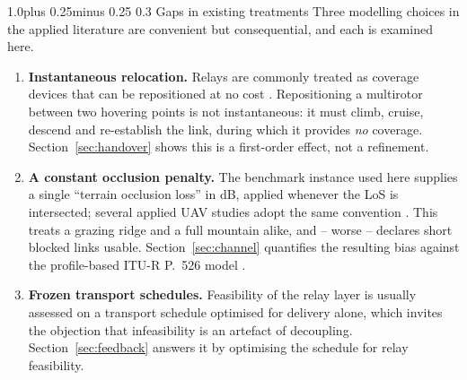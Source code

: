 \documentclass[11pt]{article}
\makeatletter
\def\subsection{\@startsection{subsection}{2}{\z@}%
    {1.0\baselineskip plus 0.25\baselineskip minus 0.25\baselineskip}%
    {0.3\baselineskip}%
    {\normalfont\normalsize\itshape}}%
\theoremstyle{dshplain}
\theoremstyle{dshdefn}
\makeatother
\begin{document}
\subsection{Gaps in existing treatments}
Three modelling choices in the applied literature are convenient but
consequential, and each is examined here.
\begin{enumerate}[leftmargin=1.5em,itemsep=2pt]
\item \textbf{Instantaneous relocation.} Relays are commonly treated as
  coverage devices that can be repositioned at no cost
  \cite{zeng,mozaffari,zengtraj,alhourani2014,hourani2016}. Repositioning a
  multirotor between two hovering points is not instantaneous: it must climb,
  cruise, descend and re-establish the link, during which it provides
  \emph{no} coverage. Section~\ref{sec:handover} shows this is a first-order
  effect, not a refinement.
\item \textbf{A constant occlusion penalty.} The benchmark instance used here
  supplies a single ``terrain occlusion loss'' in dB, applied whenever the LoS
  is intersected; several applied UAV studies adopt the same convention
  \cite{matolak,alhourani2014}. This treats a grazing ridge and a full mountain alike, and
  -- worse -- declares short blocked links usable. Section~\ref{sec:channel}
  quantifies the resulting bias against the profile-based ITU-R P.~526 model
  \cite{iturp526,deygout,matolak}.
\item \textbf{Frozen transport schedules.} Feasibility of the relay layer is
  usually assessed on a transport schedule optimised for delivery alone, which
  invites the objection that infeasibility is an artefact of decoupling.
  Section~\ref{sec:feedback} answers it by optimising the schedule for relay
  feasibility.
\end{enumerate}
\end{document}
